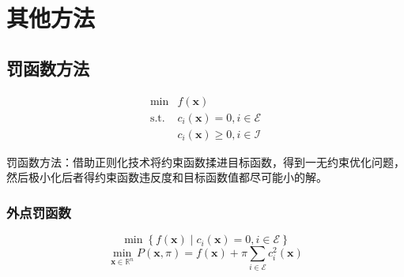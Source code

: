 \section{其他方法}
\subsection{罚函数方法}
\[
    \begin{array}{rl}
        \operatorname*{min}&f(\boldsymbol{x})\\
        \mathrm{s.t.}&c_{i}(\boldsymbol{x})=0,i\in\mathcal{E}\\
        & c_{i}(\boldsymbol{x})\geqslant0,i\in\mathcal{I}
    \end{array}
\]
\begin{definition}[罚函数方法]
    罚函数方法：借助正则化技术将约束函数揉进目标函数，得到一无约束优化问题，然后极小化后者得约束函数违反度和目标函数值都尽可能小的解。
\end{definition}
\subsubsection{外点罚函数}
\[
    \min\left\{f(\boldsymbol{x})\mid c_i(\boldsymbol{x})=0,i\in\mathcal{E}\right\}
\]
\[
    \min_{\boldsymbol{x}\in \mathbb{R}^n}P(\boldsymbol{x},\pi)=f(\boldsymbol{x})+\pi\sum_{i\in\mathcal{E}}c_i^2(\boldsymbol{x})
\]
